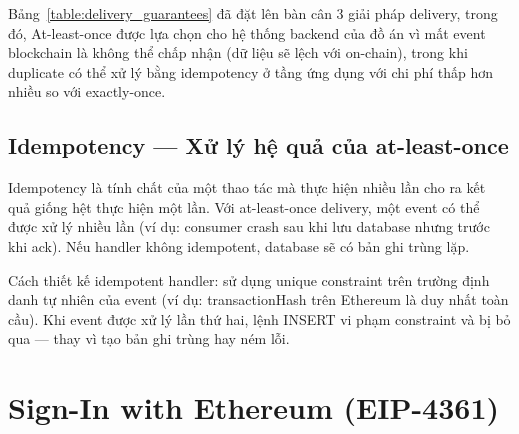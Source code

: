 \documentclass[../DoAn.tex]{subfiles}
\begin{document}
\begin{table}[H]
\centering
{}
\caption{So sánh các đảm bảo delivery}
\label{table:delivery_guarantees}
\end{table}


Bảng~\ref{table:delivery_guarantees} đã đặt lên bàn cân 3 giải pháp delivery, trong đó, At-least-once được lựa chọn cho hệ thống backend của đồ án vì mất event blockchain là không thể chấp nhận (dữ liệu sẽ lệch với on-chain), trong khi duplicate có thể xử lý bằng idempotency ở tầng ứng dụng với chi phí thấp hơn nhiều so với exactly-once.

\subsection{Idempotency --- Xử lý hệ quả của at-least-once}
\label{section:3.6.3}


Idempotency là tính chất của một thao tác mà thực hiện nhiều lần cho ra kết quả giống hệt thực hiện một lần. Với at-least-once delivery, một event có thể được xử lý nhiều lần (ví dụ: consumer crash sau khi lưu database nhưng trước khi ack). Nếu handler không idempotent, database sẽ có bản ghi trùng lặp.

Cách thiết kế idempotent handler: sử dụng unique constraint trên trường định danh tự nhiên của event (ví dụ: transactionHash trên Ethereum là duy nhất toàn cầu). Khi event được xử lý lần thứ hai, lệnh INSERT vi phạm constraint và bị bỏ qua --- thay vì tạo bản ghi trùng hay ném lỗi.

\section{Sign-In with Ethereum (EIP-4361)}
\label{section:3.7}
\end{document}
